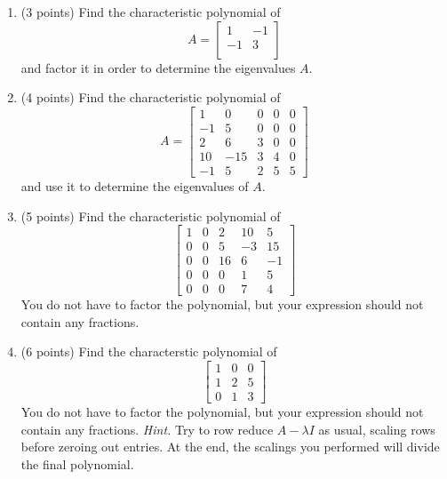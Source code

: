 \documentclass{article}
\theoremstyle{remark}
\begin{document}
\begin{enumerate}
\item (3 points) Find the characteristic polynomial of
  \begin{displaymath}
    A = \begin{bmatrix}
      1 & -1\\
      -1 & 3 \\
    \end{bmatrix}
  \end{displaymath}
  and factor it in order to determine the eigenvalues $A$.
\item (4 points) Find the characteristic polynomial of
  \begin{displaymath}
    A =
    \begin{bmatrix}
      1 & 0 & 0 & 0 & 0 \\
      -1 & 5 & 0 & 0 & 0 \\
      2 & 6 & 3 & 0 & 0 \\
      10 & -15 & 3 & 4 & 0 \\
      -1 & 5 & 2 & 5 & 5
    \end{bmatrix}
  \end{displaymath}
  and use it to determine the eigenvalues of $A$.
\item (5 points) Find the characteristic polynomial of
  \begin{displaymath}
    \begin{bmatrix}
      1 & 0 & 2 & 10 & 5 \\
      0 & 0 & 5 & -3 & 15 \\
      0 & 0 & 16 & 6 & -1 \\
      0 & 0 & 0 & 1 & 5\\
      0 & 0 & 0 & 7 & 4
    \end{bmatrix}
  \end{displaymath}
  You do not have to factor the polynomial, but your expression should not contain any fractions.
\item (6 points) Find the characterstic polynomial of
  \begin{displaymath}
    \begin{bmatrix}
      1 & 0 & 0 \\
      1 & 2 & 5 \\
      0 & 1 & 3
    \end{bmatrix}
  \end{displaymath}
  You do not have to factor the polynomial, but your expression should not contain any fractions.
  \textit{Hint.} Try to row reduce $A - \lambda I$ as usual, scaling rows before zeroing out entries.
  At the end, the scalings you performed will divide the final polynomial.
\end{enumerate}
\end{document}
